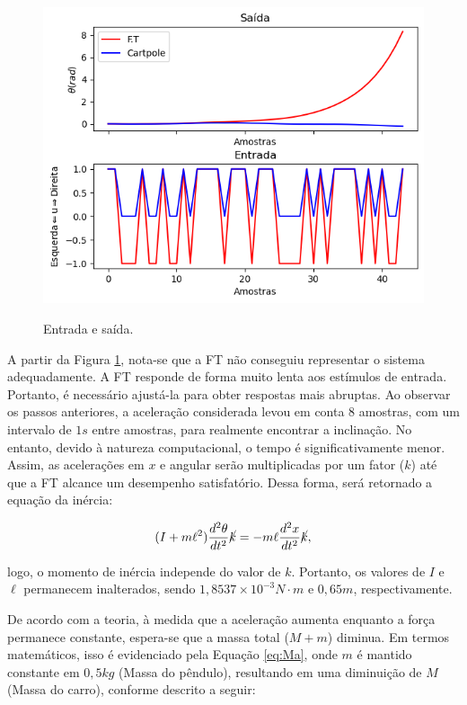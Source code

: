 \documentclass[12pt,           %
a4paper,                       %
openany,                       %
oneside,                       %
chapter=TITLE,                 %
english,                       %
spanish,                       %
brazil,                        %
sumario=tradicional]{abntex2}  %
\begin{document}
\begin{OnehalfSpace}
\begin{figure}[H]
     \centering
     \vspace*{-0.2cm}
     \caption{Entrada e saída.}
     \includegraphics[scale=.53]{entval.png}
     \label{fig:entvalft1}
\end{figure}
\vspace*{-.85cm}
{\raggedright {}}


A partir da Figura \ref{fig:entvalft1}, nota-se que a FT não conseguiu representar o sistema adequadamente. A FT responde de forma muito lenta aos estímulos de entrada. Portanto, é necessário ajustá-la para obter respostas mais abruptas. Ao observar os passos anteriores, a aceleração considerada levou em conta $8$ amostras, com um intervalo de $1s$ entre amostras, para realmente encontrar a inclinação. No entanto, devido à natureza computacional, o tempo é significativamente menor. Assim, as acelerações em $x$ e angular serão multiplicadas por um fator ($k$) até que a FT alcance um desempenho satisfatório. Dessa forma, será retornado a equação da inércia:

\begin{equation}
    (I + m\ell^2)\frac{d^2\theta}{dt^2}\cancel{k}   = - m\ell\frac{d^2x}{dt^2} \cancel{k},
    \label{eq:inercia}
\end{equation}

\noindent logo, o momento de inércia independe do valor de \(k\). Portanto, os valores de \(I\) e \(\ell\) permanecem inalterados, sendo \(1,8537\times 10^{-3} N\cdot m\) e \(0,65 m\), respectivamente.

De acordo com a teoria, à medida que a aceleração aumenta enquanto a força permanece constante, espera-se que a massa total ($M+m$) diminua. Em termos matemáticos, isso é evidenciado pela Equação \ref{eq:Ma}, onde $m$ é mantido constante em $0,5 kg$ (Massa do pêndulo), resultando em uma diminuição de $M$ (Massa do carro), conforme descrito a seguir:


\end{OnehalfSpace}
\end{document}
